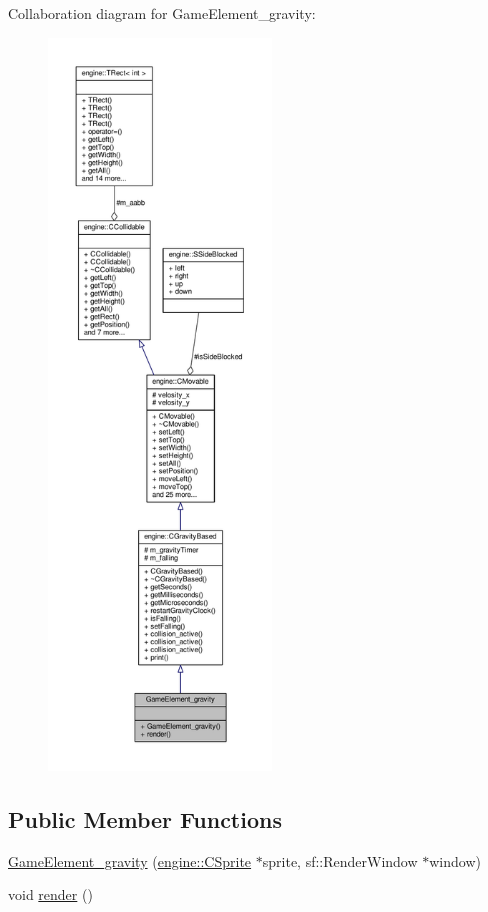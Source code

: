 Collaboration diagram for Game\-Element\-\_\-gravity\-:\nopagebreak
\begin{figure}[H]
\begin{center}
\leavevmode
\includegraphics[height=550pt]{classGameElement__gravity__coll__graph}
\end{center}
\end{figure}
\subsection*{Public Member Functions}
\begin{DoxyCompactItemize}
\item 
\hyperlink{classGameElement__gravity_a8e1fdc3529d6bb848b2f4f54dc0cf938}{Game\-Element\-\_\-gravity} (\hyperlink{classengine_1_1CSprite}{engine\-::\-C\-Sprite} $\ast$sprite, sf\-::\-Render\-Window $\ast$window)
\item 
void \hyperlink{classGameElement__gravity_a78dcd87b6096dbd621a7707cdef26550}{render} ()
\end{DoxyCompactItemize}
